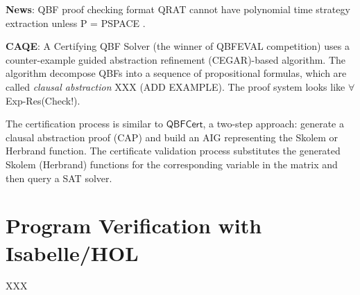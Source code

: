 \documentclass[runningheads]{llncs}
\newcommand{\qrpcert}{\mathsf{QBFCert}}
\newcommand{\0}{0}
\newcommand{\1}{1}
\def\faexp{$\forall$\textsf{Exp-Res}\xspace}
\begin{document}
\vspace{0.2cm}
\noindent\textbf{News}:  QBF proof checking format QRAT cannot have polynomial time strategy extraction unless P = PSPACE \cite{ChewC20}.

\vspace{0.3cm}
\noindent\textbf{CAQE}: A Certifying QBF Solver \cite{RabeT15} (the winner of QBFEVAL competition) uses a counter-example guided abstraction refinement (CEGAR)-based algorithm. The algorithm decompose QBFs into a sequence of propositional formulas, which are called \textit{clausal abstraction} XXX (ADD EXAMPLE). The proof system looks like \faexp (Check!).

The certification process is similar to $\qrpcert$, a two-step approach: generate a clausal abstraction proof (CAP) and build an AIG representing the Skolem or Herbrand function. The certificate validation process substitutes the generated Skolem (Herbrand) functions for the corresponding variable in the matrix and then query a SAT solver.

\section{Program Verification with Isabelle/HOL} \label{sec:Isabelle}

XXX
\end{document}
